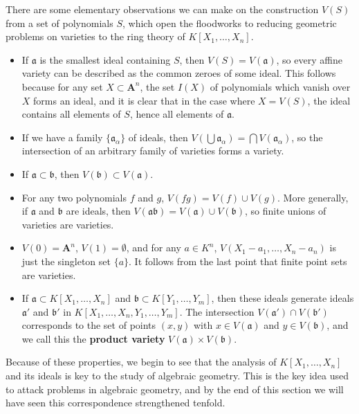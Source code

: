 There are some elementary observations we can make on the construction $V(S)$ from a set of polynomials $S$, which open the floodworks to reducing geometric problems on varieties to the ring theory of $K[X_1, \dots, X_n]$.
%
\begin{itemize}
    \item If $\mathfrak{a}$ is the smallest ideal containing $S$, then $V(S) = V(\mathfrak{a})$, so every affine variety can be described as the common zeroes of some ideal. This follows because for any set $X \subset \mathbf{A}^n$, the set $I(X)$ of polynomials which vanish over $X$ forms an ideal, and it is clear that in the case where $X = V(S)$, the ideal contains all elements of $S$, hence all elements of $\mathfrak{a}$.

    \item If we have a family $\{ \mathfrak{a}_\alpha \}$ of ideals, then $V(\bigcup \mathfrak{a}_\alpha) = \bigcap V(\mathfrak{a}_\alpha)$, so the intersection of an arbitrary family of varieties forms a variety.

    \item If $\mathfrak{a} \subset \mathfrak{b}$, then $V(\mathfrak{b}) \subset V(\mathfrak{a})$.

    \item For any two polynomials $f$ and $g$, $V(fg) = V(f) \cup V(g)$. More generally, if $\mathfrak{a}$ and $\mathfrak{b}$ are ideals, then $V(\mathfrak{a}\mathfrak{b}) = V(\mathfrak{a}) \cup V(\mathfrak{b})$, so finite unions of varieties are varieties.

    \item $V(0) = \mathbf{A}^n$, $V(1) = \emptyset$, and for any $a \in K^n$, $V(X_1-a_1,\dots,X_n - a_n)$ is just the singleton set $\{ a \}$. It follows from the last point that finite point sets are varieties.

    \item If $\mathfrak{a} \subset K[X_1, \dots, X_n]$ and $\mathfrak{b} \subset K[Y_1, \dots, Y_m]$, then these ideals generate ideals $\mathfrak{a}'$ and $\mathfrak{b}'$ in $K[X_1, \dots, X_n, Y_1, \dots, Y_m]$. The intersection $V(\mathfrak{a}') \cap V(\mathfrak{b}')$ corresponds to the set of points $(x,y)$ with $x \in V(\mathfrak{a})$ and $y \in V(\mathfrak{b})$, and we call this the {\bf product variety} $V(\mathfrak{a}) \times V(\mathfrak{b})$.
\end{itemize}
%
Because of these properties, we begin to see that the analysis of $K[X_1, \dots, X_n]$ and its ideals is key to the study of algebraic geometry. This is the key idea used to attack problems in algebraic geometry, and by the end of this section we will have seen this correspondence strengthened tenfold.

